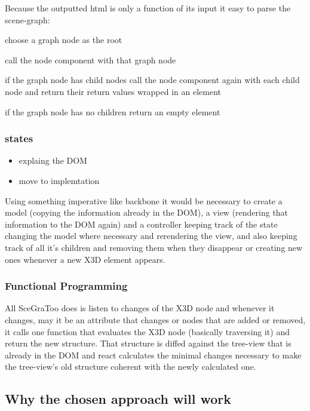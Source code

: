 Because the outputted html is only a function of its input it easy to
parse the scene-graph:
\begin{enumerate*}
  \item choose a graph node as the root
  \item call the node component with that graph node
  \item if the graph node has child nodes call the node component again with each child node and return their return values wrapped in an element
  \item if the graph node has no children return an empty element
\end{enumerate*}

\subsubsection{states}\label{states}

\begin{itemize}
  \item explaing the DOM
  \item move to implemtation
\end{itemize}

Using something imperative like backbone it would be necessary to create
a model (copying the information already in the DOM), a view (rendering
that information to the DOM again) and a controller keeping track of the
state changing the model where necessary and rerendering the view, and
also keeping track of all it's children and removing them when they
disappear or creating new ones whenever a new X3D element appears.

\subsubsection{Functional Programming}\label{functional-programming}

All SceGraToo does is listen to changes of the \gls{X3D} node and whenever it
changes, may it be an attribute that changes or nodes that are added or
removed, it calls one function that evaluates the X3D node (basically
traversing it) and return the new structure. That structure is diffed
against the tree-view that is already in the DOM and react calculates
the minimal changes necessary to make the tree-view's old structure
coherent with the newly calculated one.

\subsection{Why the chosen approach will
work}\label{why-the-chosen-approach-will-work}

